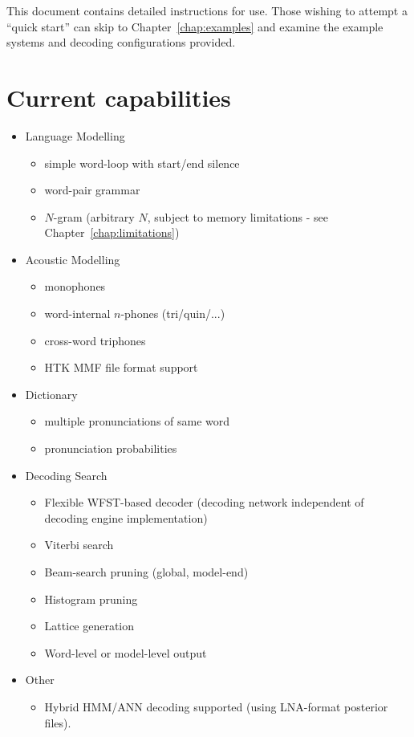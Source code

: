\documentclass[a4paper,12pt]{report}
\begin{document}
This document contains detailed instructions for use. Those wishing to attempt a ``quick start'' can skip to Chapter~\ref{chap:examples} and examine the example systems and decoding configurations provided.

\section{Current capabilities}

\begin{itemize}
\item Language Modelling
\begin{itemize}
   \item simple word-loop with start/end silence
   \item word-pair grammar
   \item $N$-gram (arbitrary $N$, subject to memory limitations - see Chapter~\ref{chap:limitations})
\end{itemize}
\item Acoustic Modelling
\begin{itemize}
   \item monophones
   \item word-internal $n$-phones (tri/quin/...)
   \item cross-word triphones
   \item HTK MMF file format support
\end{itemize}
\item Dictionary
\begin{itemize}
   \item multiple pronunciations of same word
   \item pronunciation probabilities
\end{itemize}
\item Decoding Search
\begin{itemize}
   \item Flexible WFST-based decoder (decoding network independent of decoding engine implementation)
   \item Viterbi search
   \item Beam-search pruning (global, model-end)
   \item Histogram pruning
   \item Lattice generation
   \item Word-level or model-level output
\end{itemize}
\item Other
\begin{itemize}
   \item Hybrid HMM/ANN decoding supported (using LNA-format posterior files).
\end{itemize}
\end{itemize}
\end{document}
